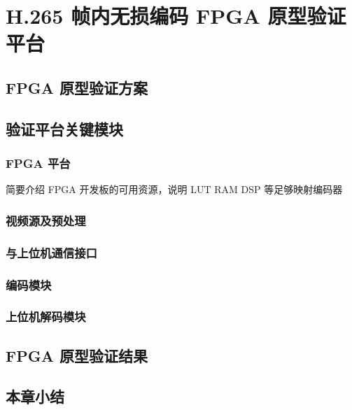 \chapter{H.265 帧内无损编码 FPGA 原型验证平台}
\label{cha:c5}

\section{FPGA 原型验证方案}

\section{验证平台关键模块}
\subsection{FPGA 平台}
\/\/ 简要介绍 FPGA 开发板的可用资源，说明 LUT RAM DSP 等足够映射编码器 \/\/

\subsection{视频源及预处理}

\subsection{与上位机通信接口}

\subsection{编码模块}

\subsection{上位机解码模块}

\section{FPGA 原型验证结果}

\section{本章小结}